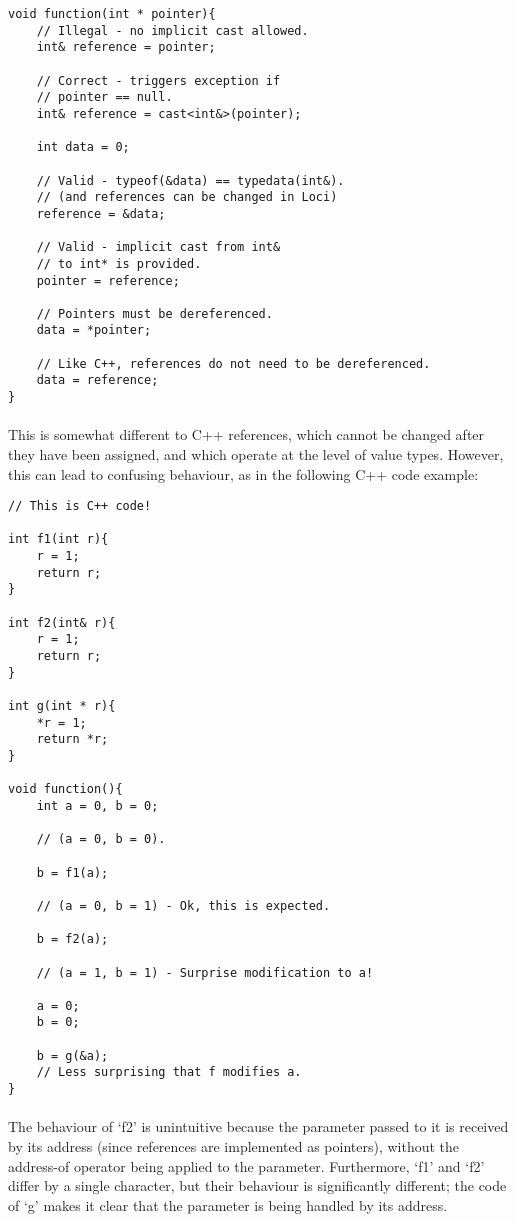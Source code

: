 \documentclass[12pt,twoside,notitlepage]{report}
\begin{document}
\begin{lstlisting}
void function(int * pointer){
	// Illegal - no implicit cast allowed.
	int& reference = pointer;
	
	// Correct - triggers exception if
	// pointer == null.
	int& reference = cast<int&>(pointer);
	
	int data = 0;
	
	// Valid - typeof(&data) == typedata(int&).
	// (and references can be changed in Loci)
	reference = &data;
	
	// Valid - implicit cast from int&
	// to int* is provided.
	pointer = reference;
	
	// Pointers must be dereferenced.
	data = *pointer;
	
	// Like C++, references do not need to be dereferenced.
	data = reference;
}
\end{lstlisting}


\paragraph{}
This is somewhat different to C++ references, which cannot be changed after they have been assigned, and which operate at the level of value types. However, this can lead to confusing behaviour, as in the following C++ code example:


\begin{lstlisting}
// This is C++ code!

int f1(int r){
	r = 1;
	return r;
}

int f2(int& r){
	r = 1;
	return r;
}

int g(int * r){
	*r = 1;
	return *r;
}

void function(){
	int a = 0, b = 0;
	
	// (a = 0, b = 0).
	
	b = f1(a);
	
	// (a = 0, b = 1) - Ok, this is expected.
	
	b = f2(a);
	
	// (a = 1, b = 1) - Surprise modification to a!
	
	a = 0;
	b = 0;
	
	b = g(&a);
	// Less surprising that f modifies a.
}
\end{lstlisting}


\paragraph{}
The behaviour of `f2' is unintuitive because the parameter passed to it is received by its address (since references are implemented as pointers), without the address-of operator being applied to the parameter. Furthermore, `f1' and `f2' differ by a single character, but their behaviour is significantly different; the code of `g' makes it clear that the parameter is being handled by its address.
\end{document}
